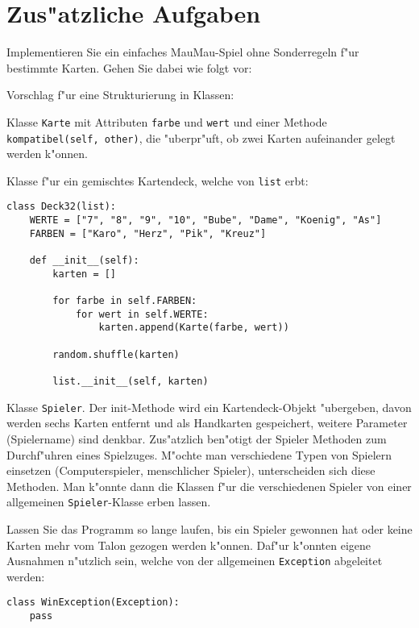 \section*{Zus"atzliche Aufgaben}

\begin{aufgabe}[MauMau]
Implementieren Sie ein einfaches MauMau-Spiel ohne Sonderregeln f"ur bestimmte Karten. Gehen Sie dabei wie folgt vor:

\begin{teilaufgabe}[Grundlagen]
Vorschlag f"ur eine Strukturierung in Klassen:
\begin{auflistung}
\item Klasse \lstinline{Karte} mit Attributen \lstinline{farbe} und \lstinline{wert} und einer Methode \lstinline{kompatibel(self, other)}, die "uberpr"uft, ob zwei Karten aufeinander gelegt werden k"onnen.
\item Klasse f"ur ein gemischtes Kartendeck, welche von \lstinline{list} erbt:
\begin{lstlisting}
class Deck32(list):
    WERTE = ["7", "8", "9", "10", "Bube", "Dame", "Koenig", "As"]
    FARBEN = ["Karo", "Herz", "Pik", "Kreuz"]

    def __init__(self):
        karten = []

        for farbe in self.FARBEN:
            for wert in self.WERTE:
                karten.append(Karte(farbe, wert))

        random.shuffle(karten)

        list.__init__(self, karten)
\end{lstlisting}
\item Klasse \lstinline{Spieler}. Der init-Methode wird ein Kartendeck-Objekt "ubergeben, davon werden sechs Karten entfernt und als Handkarten gespeichert, weitere Parameter (Spielername) sind denkbar. Zus"atzlich ben"otigt der Spieler Methoden zum Durchf"uhren eines Spielzuges. M"ochte man verschiedene Typen von Spielern einsetzen (Computerspieler, menschlicher Spieler), unterscheiden sich diese Methoden. Man k"onnte dann die Klassen f"ur die verschiedenen Spieler von einer allgemeinen \lstinline{Spieler}-Klasse erben lassen.
\end{auflistung}
Lassen Sie das Programm so lange laufen, bis ein Spieler gewonnen hat oder keine Karten mehr vom Talon gezogen werden k"onnen. Daf"ur k"onnten eigene Ausnahmen n"utzlich sein, welche von der allgemeinen \lstinline{Exception} abgeleitet werden:
\begin{lstlisting}
class WinException(Exception):
    pass


\end{lstlisting}
\end{teilaufgabe}
\end{aufgabe}
